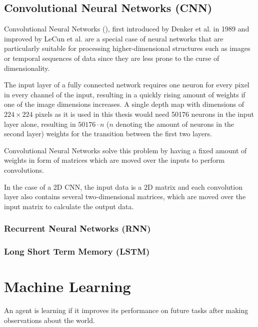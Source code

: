 	
	\subsection { Convolutional Neural Networks (CNN) }
		Convolutional Neural Networks (), first introduced by Denker et al. in 1989 \cite{Denker1988} and improved by LeCun et al. \cite{LeCun1989} are a special case of neural networks that are particularly suitable for processing higher-dimensional structures such as images or temporal sequences of data since they are less prone to the curse of dimensionality.
		
		The input layer of a fully connected network requires one neuron for every pixel in every channel of the input, resulting in a quickly rising amount of weights if one of the image dimensions increases. A single depth map with dimensions of $224 \times 224$ pixels as it is used in this thesis would need 50176 neurons in the input layer alone, resulting in $50176 \cdot n$ ($n$ denoting the amount of neurons in the second layer) weights for the transition between the first two layers. 
		
		Convolutional Neural Networks solve this problem by having a fixed amount of weights in form of matrices which are moved over the inputs to perform convolutions.  
		
		
		
		
		
		In the case of a 2D CNN, the input data is a 2D matrix and each convolution layer also contains several two-dimensional matrices, which are moved over the input matrix to calculate the output data. 
		
		
	
	
	\subsubsection { Recurrent Neural Networks (RNN) }
	
	\subsubsection { Long Short Term Memory (LSTM) }
	
	
		
\section { Machine Learning }
	\begin{displayquote}
		An agent is learning if it improves its performance on future tasks after making observations about the world.
	\end{displayquote}
	
